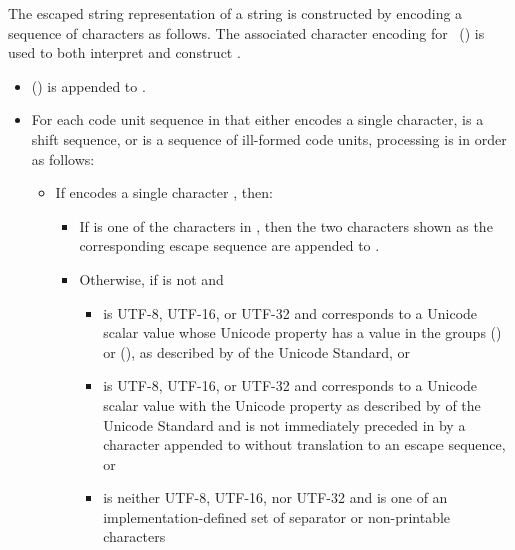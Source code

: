 \pnum
The escaped string  representation of a string 
is constructed by encoding a sequence of characters as follows.
The associated character encoding 
for ~()
is used to both interpret  and construct .

\begin{itemize}
\item
{} () is appended to .

\item
For each code unit sequence  in  that either
encodes a single character,
is a shift sequence, or
is a sequence of ill-formed code units,
processing is in order as follows:

\begin{itemize}
\item
If  encodes a single character , then:

\begin{itemize}
\item
If  is one of the characters in ,
then the two characters shown as the corresponding escape sequence
are appended to .

\item
Otherwise, if  is not  and

\begin{itemize}
\item
{} is UTF-8, UTF-16, or UTF-32 and
 corresponds to a Unicode scalar value
whose Unicode property  has a value in the groups
 () or  (),
as described by  of the Unicode Standard, or

\item
{} is UTF-8, UTF-16, or UTF-32 and
 corresponds to a Unicode scalar value
with the Unicode property 
as described by  of the Unicode Standard and
 is not immediately preceded in  by
a character  appended to 
without translation to an escape sequence, or

\item
{} is neither UTF-8, UTF-16, nor UTF-32 and
 is one of an implementation-defined set
of separator or non-printable characters
\end{itemize}


\end{itemize}
\end{itemize}
\end{itemize}
